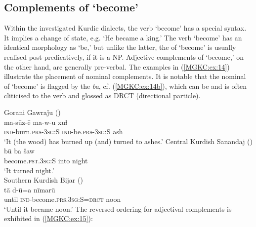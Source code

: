 \documentclass[output=paper,colorlinks,citecolor=brown]{langscibook}
\begin{document}
\begin{sloppypar}
\subsection{Complements of `become'} \label{subs_become_cop}
Within the investigated Kurdic dialects, the  verb `become' has a special syntax. It implies a change of state, e.g. `He became a king.' The verb `become' has an identical morphology as `be,' but unlike the latter, the  of `become' is usually realised post-predicatively, if it is a NP. Adjective complements of `become,' on the other hand, are generally pre-verbal. The examples in (\ref{MGKC:ex:14}) illustrate the placement of nominal complements. It is notable that the nominal  of  `become' is flagged by the  \textit{ba}, cf. (\ref{MGKC:ex:14b}), which can be and is often cliticised to the verb and glossed as DRCT (directional particle).

\ea\label{MGKC:ex:14}
\ea\label{MGKC:ex:14a}
Gorani Gawraǰu (\citealt[E, 0786]{mohammadirad_gorani_2022}) \\
\gll ma-sūz-ē ma-w-u xuɫ \\
\textsc{ind-}burn.\textsc{prs-3sg:S} \textsc{ind}-be.\textsc{prs-3sg:S} ash \\
\glt `It (the wood) has burned up (and) turned to ashes.'
\ex\label{MGKC:ex:14b}
Central Kurdish Sanandaj (\citealt[C, 0430]{mohammadirad_Sanandaj_Kurdish_2022}) \\
\gll bū ba šaw \\
become.\textsc{pst.3sg:S} into night \\
\glt `It turned night.' \\
\ex\label{MGKC:ex:14c}
Southern Kurdish Bijar (\citealt[B, 112]{mohammadirad_Bijar_Kurdish_2022}) \\
\gll tā d-ū=a nīmarū \\
until \textsc{ind-}become\textsc{.prs.3sg:S=drct} noon \\
\glt `Until it became noon.'
\z
\z 
The reversed ordering for adjectival complements is exhibited in (\ref{MGKC:ex:15}):


\end{sloppypar}
\end{document}
